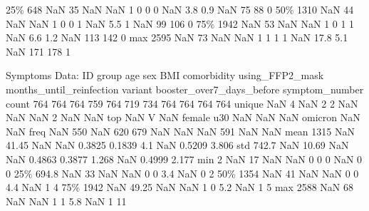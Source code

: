 \documentclass[11pt]{article}
\begin{document}
\begin{codeoutput}
25\%      648    NaN    35     NaN    NaN                1                0              0        0                NaN                        3.8                   0.9              NaN                  75                 88                0
50\%     1310    NaN    44     NaN    NaN                1                0              0        1                NaN                        5.5                     1              NaN                  99                106                0
75\%     1942    NaN    53     NaN    NaN                1                0              1        1                NaN                        6.6                   1.2              NaN                 113                142                0
max     2595    NaN    73     NaN    NaN                1                1              1        1                NaN                       17.8                   5.1              NaN                 171                178                1

Symptoms Data:
          ID group   age     sex  BMI  comorbidity  using\_FFP2\_mask  months\_until\_reinfection  variant  booster\_over7\_days\_before  symptom\_number
count    764   764   764     759  764          719              734                       764      764                        764             764
unique   NaN     4   NaN       2    2          NaN              NaN                       NaN        2                        NaN             NaN
top      NaN     V   NaN  female  u30          NaN              NaN                       NaN  omicron                        NaN             NaN
freq     NaN   550   NaN     620  679          NaN              NaN                       NaN      591                        NaN             NaN
mean    1315   NaN 41.45     NaN  NaN       0.3825           0.1839                       4.1      NaN                     0.5209           3.806
std    742.7   NaN 10.69     NaN  NaN       0.4863           0.3877                     1.268      NaN                     0.4999           2.177
min        2   NaN    17     NaN  NaN            0                0                         0      NaN                          0               0
25\%    694.8   NaN    33     NaN  NaN            0                0                       3.4      NaN                          0               2
50\%     1354   NaN    41     NaN  NaN            0                0                       4.4      NaN                          1               4
75\%     1942   NaN 49.25     NaN  NaN            1                0                       5.2      NaN                          1               5
max     2588   NaN    68     NaN  NaN            1                1                       5.8      NaN                          1              11


\end{codeoutput}
\end{document}
